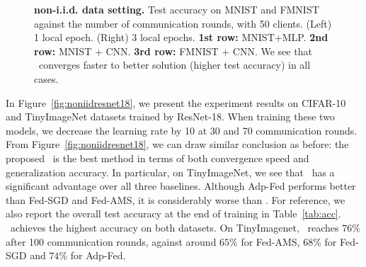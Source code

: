 \documentclass[nohyperref]{article}
\begin{document}
\begin{figure}[t]
\begin{center}
{        }
    \end{center}
	\caption{\textbf{non-i.i.d. data setting.} Test accuracy on MNIST and FMNIST against the number of communication rounds, with 50 clients. (Left) 1 local epoch. (Right) 3 local epochs. \textbf{1st row:} MNIST+MLP. \textbf{2nd row:} MNIST + CNN. \textbf{3rd row:} FMNIST + CNN. We see that \algo\ converges faster to better solution (higher test accuracy) in all cases.}
	\label{fig:noniid}
\end{figure}


In Figure~\ref{fig:noniidresnet18}, we present the experiment results on CIFAR-10 and TinyImageNet datasets trained by ResNet-18. When training these two models, we decrease the learning rate by 10 at 30 and 70 communication rounds. From Figure~\ref{fig:noniidresnet18}, we can draw similar conclusion as before: the proposed \algo\ is the best method in terms of both convergence speed and generalization accuracy. In particular, on TinyImageNet, we see that \algo\ has a significant advantage over all three baselines. Although Adp-Fed performs better than Fed-SGD and Fed-AMS, it is considerably worse than \algo. For reference, we also report the overall test accuracy at the end of training in Table~\ref{tab:acc}. \algo\ achieves the highest accuracy on both datasets. On TinyImagenet, \algo\ reaches $76\%$ after 100 communication rounds, against around $65\%$ for Fed-AMS, $68\%$ for Fed-SGD and $74\%$ for Adp-Fed.
\end{document}
